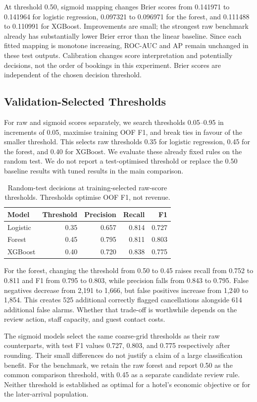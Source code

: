 At threshold 0.50, sigmoid mapping changes Brier scores from 0.141971 to 0.141964 for logistic regression, 0.097321 to 0.096971 for the forest, and 0.111488 to 0.110991 for XGBoost. Improvements are small; the strongest raw benchmark already has substantially lower Brier error than the linear baseline. Since each fitted mapping is monotone increasing, ROC-AUC and AP remain unchanged in these test outputs. Calibration changes score interpretation and potentially decisions, not the order of bookings in this experiment. Brier scores are independent of the chosen decision threshold.

\subsection{Validation-Selected Thresholds}
For raw and sigmoid scores separately, we search thresholds 0.05--0.95 in increments of 0.05, maximise training OOF F1, and break ties in favour of the smaller threshold. This selects raw thresholds 0.35 for logistic regression, 0.45 for the forest, and 0.40 for XGBoost. We evaluate these already fixed rules on the random test. We do not report a test-optimised threshold or replace the 0.50 baseline results with tuned results in the main comparison.

\begin{table}[t]
\centering
\caption{Random-test decisions at training-selected raw-score thresholds. Thresholds optimise OOF F1, not revenue.}
\label{tab:thresholds}
\begin{tabular}{lrrrr}
\toprule
Model & Threshold & Precision & Recall & F1\\
\midrule
Logistic & 0.35 & 0.657 & 0.814 & 0.727\\
Forest & 0.45 & 0.795 & 0.811 & 0.803\\
XGBoost & 0.40 & 0.720 & 0.838 & 0.775\\
\bottomrule
\end{tabular}
\end{table}

For the forest, changing the threshold from 0.50 to 0.45 raises recall from 0.752 to 0.811 and F1 from 0.795 to 0.803, while precision falls from 0.843 to 0.795. False negatives decrease from 2,191 to 1,666, but false positives increase from 1,240 to 1,854. This creates 525 additional correctly flagged cancellations alongside 614 additional false alarms. Whether that trade-off is worthwhile depends on the review action, staff capacity, and guest contact costs.

The sigmoid models select the same coarse-grid thresholds as their raw counterparts, with test F1 values 0.727, 0.803, and 0.775 respectively after rounding. Their small differences do not justify a claim of a large classification benefit. For the benchmark, we retain the raw forest and report 0.50 as the common comparison threshold, with 0.45 as a separate candidate review rule. Neither threshold is established as optimal for a hotel's economic objective or for the later-arrival population.
